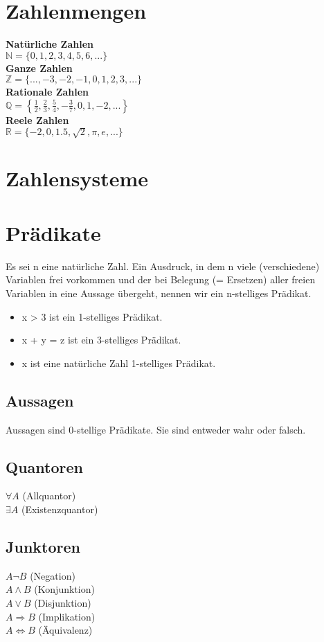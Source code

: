 \section{Zahlenmengen}
{\bf Natürliche Zahlen}\\
\(\mathbb{N} = \{0,1,2,3,4,5,6,...\}\) \\
{\bf Ganze Zahlen}\\
\(\mathbb{Z} = \{...,-3,-2,-1,0,1,2,3,...\}\) \\
{\bf Rationale Zahlen}\\
\(\mathbb{Q} = \left\{ \frac{1}{2}, \frac{2}{3}, \frac{5}{4}, -\frac{3}{7}, 0, 1, -2, ... \right\}\) \\
{\bf Reele Zahlen}\\
\(\mathbb{R} = \{ -2, 0, 1.5, \sqrt{2}, \pi, e, ... \}\)

\section{Zahlensysteme}

\section{Prädikate}
Es sei n eine natürliche Zahl. Ein Ausdruck, in dem n viele
(verschiedene) Variablen frei vorkommen und der bei Belegung (=
Ersetzen) aller freien Variablen in eine Aussage übergeht, nennen wir
ein n-stelliges Prädikat.
\begin{itemize}
    \item x > 3 ist ein 1-stelliges Prädikat.
    \item x + y = z ist ein 3-stelliges Prädikat.
    \item x ist eine natürliche Zahl 1-stelliges Prädikat.
\end{itemize}
\subsection{Aussagen}
Aussagen sind 0-stellige Prädikate. Sie sind entweder wahr oder falsch.
\subsection{Quantoren}
\(\forall A\) (Allquantor)\\
\(\exists A\) (Existenzquantor)
\subsection{Junktoren}
\(A \neg B\) (Negation)\\
\(A \wedge B\) (Konjunktion)\\
\(A \vee B\) (Disjunktion)\\
\(A \Rightarrow B\) (Implikation)\\
\(A \Leftrightarrow B\) (Äquivalenz)

